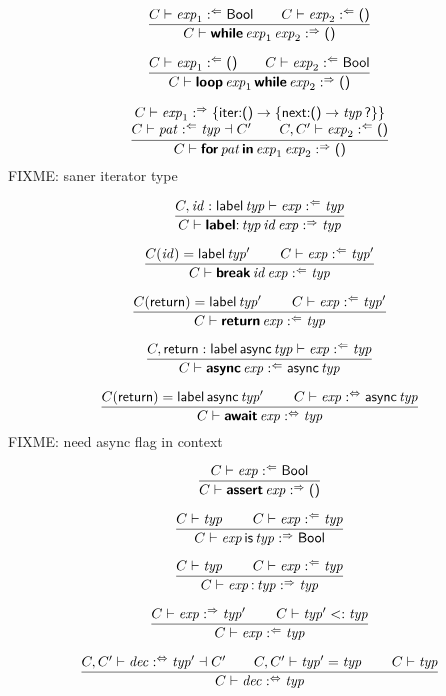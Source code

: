 $$
\frac{
  C \vdash \x{exp}_1 \anal \K{Bool}
  \qquad
  C \vdash \x{exp}_2 \anal \K{()}
}{
  C \vdash \KK{while} \x{exp}_1 \x{exp}_2 \synth \K{()}
}
$$

$$
\frac{
  C \vdash \x{exp}_1 \anal \K{()}
  \qquad
  C \vdash \x{exp}_2 \anal \K{Bool}
}{
  C \vdash \KK{loop} \x{exp}_1 \KK{while} \x{exp}_2 \synth \K{()}
}
$$

$$
\frac{
  \begin{array}{@{}c@{}}
  C \vdash \x{exp}_1 \synth \{{\K{iter}} \K: \K{()} \Kto \K\{\K{next} \K: \K{()} \Kto \x{typ} \K?\}\} 
  \\
  C \vdash \x{pat} \anal \x{typ} \dashv C'
  \qquad
  C, C' \vdash \x{exp}_2 \anal \K{()}
  \end{array}
}{
  C \vdash \KK{for} \x{pat} \KK{in} \x{exp}_1 \x{exp}_2 \synth \K{()}
}
$$
FIXME: saner iterator type

$$
\frac{
  C, \x{id} : \K{label} \x{typ} \vdash \x{exp} \anal \x{typ}
}{
  C \vdash \KK{label} \K: \x{typ} \x{id} \x{exp} \synth \x{typ}
}
$$

$$
\frac{
  C(\x{id}) = \K{label} \x{typ}'
  \qquad
  C \vdash \x{exp} \anal \x{typ}'
}{
  C \vdash \KK{break} \x{id} \x{exp} \anal \x{typ}
}
$$

$$
\frac{
  C(\K{return}) = \K{label} \x{typ}'
  \qquad
  C \vdash \x{exp} \anal \x{typ}'
}{
  C \vdash \KK{return} \x{exp} \anal \x{typ}
}
$$

$$
\frac{
  C, \K{return} : \K{label} \, \K{async} \x{typ} \vdash \x{exp} \anal \x{typ}
}{
  C \vdash \KK{async} \x{exp} \anal \K{async} \x{typ}
}
$$

$$
\frac{
  C(\K{return}) = \K{label} \, \K{async} \x{typ}'
  \qquad
  C \vdash \x{exp} \analsynth \K{async} \x{typ}
}{
  C \vdash \KK{await} \x{exp} \analsynth \x{typ}
}
$$
FIXME: need async flag in context

$$
\frac{
  C \vdash \x{exp} \anal \K{Bool}
}{
  C \vdash \KK{assert} \x{exp} \synth \K{()}
}
$$

$$
\frac{
  C \vdash \x{typ}
  \qquad
  C \vdash \x{exp} \anal \x{typ}
}{
  C \vdash \x{exp} \K{is} \x{typ} \synth \K{Bool}
}
$$

$$
\frac{
  C \vdash \x{typ}
  \qquad
  C \vdash \x{exp} \anal \x{typ}
}{
  C \vdash \x{exp} \K: \x{typ} \synth \x{typ}
}
$$

$$
\frac{
  C \vdash \x{exp} \synth \x{typ}'
  \qquad
  C \vdash \x{typ}' <: \x{typ}
}{
  C \vdash \x{exp} \anal \x{typ}
}
$$

$$
\frac{
  C, C' \vdash \x{dec} \analsynth \x{typ}' \dashv C'
  \qquad
  C, C' \vdash \x{typ}' = \x{typ}
  \qquad
  C \vdash \x{typ}
}{
  C \vdash \x{dec} \analsynth \x{typ}
}
$$

